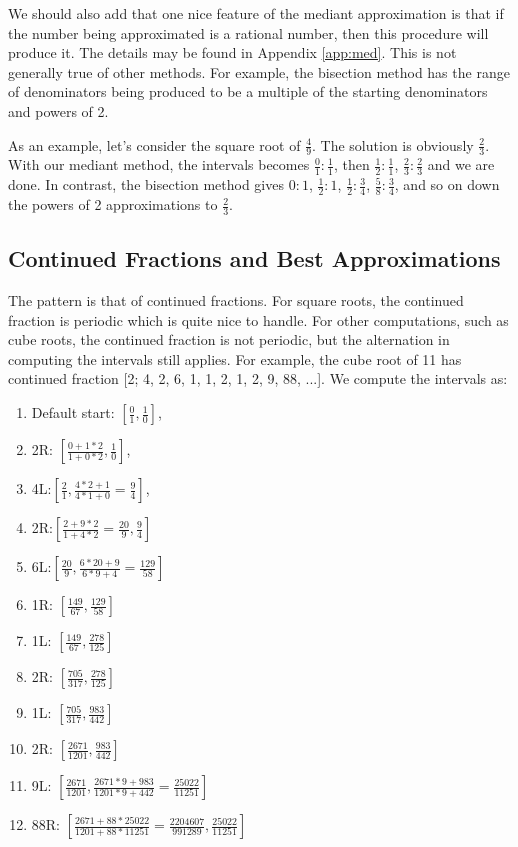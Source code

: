\documentclass[12pt]{article}
\begin{document}
We should also add that one nice feature of the mediant approximation is that if the number being approximated is a rational number, then this procedure will produce it. The details may be found in Appendix \ref{app:med}. This is not generally true of other methods. For example, the bisection method has the range of denominators being produced to be a multiple of the starting denominators and powers of 2. 

As an example, let's consider the square root of $\frac{4}{9}$. The solution is obviously $\frac{2}{3}$. With our mediant method, the intervals becomes $\frac{0}{1}:\frac{1}{1}$, then $\frac{1}{2}:\frac{1}{1}$, $\frac{2}{3}:\frac{2}{3}$ and we are done. In contrast, the bisection method gives $0:1$, $\frac{1}{2}:1$, $\frac{1}{2}:\frac{3}{4}$, $\frac{5}{8}:\frac{3}{4}$, and so on down the powers of 2 approximations to $\frac{2}{3}$. 

 

\subsection{Continued Fractions and Best Approximations}


The pattern is that of continued fractions. For square roots, the continued fraction is periodic which is quite nice to handle. For other computations, such as cube roots, the continued fraction is not periodic, but the alternation in computing the intervals still applies. For example, the cube root of 11 has continued fraction [2; 4, 2, 6, 1, 1, 2, 1, 2, 9, 88, ...]. We compute the intervals as:  
\begin{enumerate}
\item Default start: $[\frac{0}{1}, \frac{1}{0}]$, 
\item 2R: $[\frac{0+1*2}{1+0*2}, \frac{1}{0}]$, 
\item 4L:$[\frac{2}{1}, \frac{4*2+1}{4*1+0} =\frac{9}{4}]$, 
\item 2R:$[\frac{2+9*2}{1+4*2} = \frac{20}{9}, \frac{9}{4}]$
\item 6L:$[\frac{20}{9}, \frac{6*20+9}{6*9 + 4} = \frac{129}{58}]$
\item 1R: $[\frac{149}{67}, \frac{129}{58}]$
\item 1L: $[\frac{149}{67}, \frac{278}{125}]$
\item 2R: $[\frac{705}{317}, \frac{278}{125}]$
\item 1L: $[\frac{705}{317}, \frac{983}{442}]$
\item 2R: $[\frac{2671}{1201}, \frac{983}{442}]$
\item 9L: $[\frac{2671}{1201}, \frac{2671*9+983}{1201*9+442} = \frac{25022}{11251}]$
\item 88R: $[\frac{2671+88*25022}{1201+88*11251} = \frac{2204607}{991289}, \frac{25022}{11251}]$
\end{enumerate}
\end{document}
